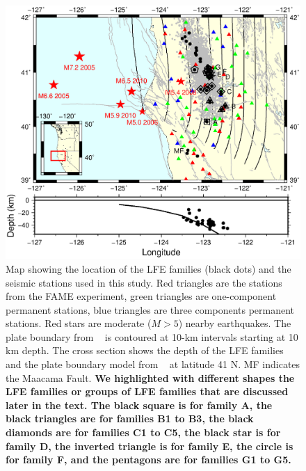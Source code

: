 \documentclass[draft]{agujournal2019}
\begin{document}
\begin{figure}
\noindent\includegraphics[width=\textwidth, trim={0.5cm 7cm 1.5cm 7cm},clip]{figures/map_LFEs.eps}
\caption{Map showing the location of the LFE families (black dots) and the seismic stations used in this study. Red triangles are the stations from the FAME experiment, green triangles are one-component permanent stations, blue triangles are three components permanent stations. Red stars are moderate ($M > 5$) nearby earthquakes. The plate boundary from ~ is contoured at 10-km intervals starting at 10 km depth. The cross section shows the depth of the LFE families ~\cite{PLO_2015} and the plate boundary model from ~ at latitude 41 N. MF indicates the Maacama Fault. \textbf{We highlighted with different shapes the LFE families or groups of LFE families that are discussed later in the text. The black square is for family A, the black triangles are for families B1 to B3, the black diamonds are for families C1 to C5, the black star is for family D, the inverted triangle is for family E, the circle is for family F, and the pentagons are for families G1 to G5.}}
\label{pngfiguresample}
\end{figure}
\end{document}
